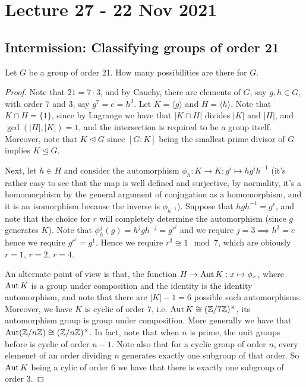 \section{Lecture 27 - 22 Nov 2021}
\subsection{Intermission: Classifying groups of order 21}
\begin{example}
  Let $G$ be a group of order 21. How many possibilities are there for $G$.
\end{example}
\begin{proof}
  Note that $21=7\cdot 3$, and by Cauchy, there are elements of $G$, say $g,h\in G$, with
  order $7$ and $3$, say $g^7=e=h^3$. Let $K=\langle g\rangle$ and $H=\langle h\rangle$.
  Note that $K\cap H=\{1\}$, since by Lagrange we have that $|K\cap H|$ divides $|K|$ and
  $|H|$, and $\gcd(|H|,|K|)=1$, and the intersection is required to be a group itself.
  Moreover, note that $K\trianglelefteq G$ since $[G:K]$ being the smallest prime divisor
  of $G$ implies $K\trianglelefteq G$.

  Next, let $h\in H$ and consider the automorphism $\phi_h:K\to K:g^i\mapsto hg^ih^{-1}$
  (it's rather easy to see that the map is well defined and surjective, by normality, it's
  a homomorphism by the general argument of conjugation as a homomorphism, and it is an
  isomorphism because the inverse is $\phi_{h^{-1}}$). Suppose that $hgh^{-1}=g^r$, and note
  that the choice for $r$ will completely determine the automorphism (since $g$ generates
  $K$). Note that $\phi_h^{j}(g)=h^jgh^{-j}=g^{r^j}$ and we require $j=3\implies h^3=e$
  hence we require $g^{r^j}=g^1$. Hence we require $r^3\cong 1 \mod 7$, which are obiously
  $r=1$, $r=2$, $r=4$. 

  An alternate point of view is that, the function $H\to \operatorname{Aut} K:x\mapsto \phi_x$, where
  $\operatorname{Aut} K$ is a group under composition and the identity is the identity automorphism, and
  note that there are $|K|-1=6$ possible such automorphisms.  Moreover, we have $K$ is
  cyclic of order $7$, i.e. $\operatorname{Aut} K \cong (\mathbb Z/7\mathbb Z)^{\times}$, its automorphism group is
  group under composition. More generally we have that $\operatorname{Aut}(\mathbb Z/n\mathbb Z)\cong
  (\mathbb Z/n\mathbb Z)^{\times}$.  In fact, note that when $n$ is prime, the unit groups before is
  cyclic of order $n-1$. Note also that for a cyclic group of order $n$, every elemenet of an
  order dividing $n$ generates exactly one subgroup of that order. So $\operatorname{Aut} K$ being
  a cylic of order $6$ we have that there is exactly one subgroup of order $3$.


\end{proof}
